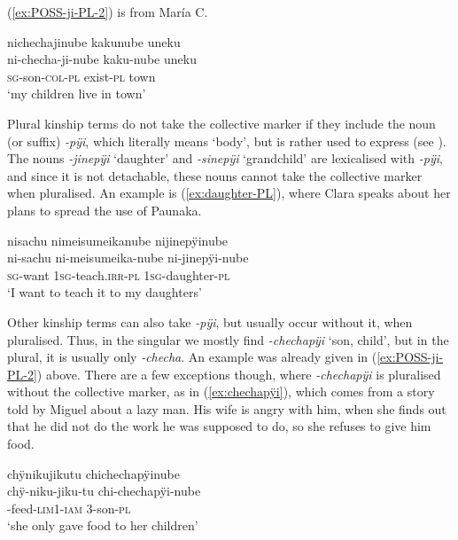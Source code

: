 (\ref{ex:POSS-ji-PL-2}) is from María C.

\ea\label{ex:POSS-ji-PL-2}
\begingl 
\glpreamble nichechajinube kakunube uneku\\
\gla ni-checha-ji-nube kaku-nube uneku\\ 
\textsc{sg}-son-\textsc{col}-\textsc{pl} exist-\textsc{pl} town\\ 
\glft ‘my children live in town’\\ 
\endgl
\trailingcitation{[uxx-p110825l.075]}
\xe
{}


Plural kinship terms do not take the collective marker if they include the noun (or suffix) \textit{-pÿi}, which literally means ‘body’, but is rather used to express  (see ). The nouns \textit{-jinepÿi} ‘daughter’ and \textit{-sinepÿi} ‘grandchild’ are lexicalised with \textit{-pÿi}, and since it is not detachable, these nouns cannot take the collective marker when pluralised. An example is (\ref{ex:daughter-PL}), where Clara speaks about her plans to spread the use of Paunaka.

\ea\label{ex:daughter-PL}
\begingl 
\glpreamble nisachu nimeisumeikanube nijinepÿinube\\
\gla ni-sachu ni-meisumeika-nube ni-jinepÿi-nube\\ 
\textsc{sg}-want 1\textsc{sg}-teach.\textsc{irr}-\textsc{pl} 1\textsc{sg}-daughter-\textsc{pl}\\ 
\glft ‘I want to teach it to my daughters’\\ 
\endgl
\trailingcitation{[cux-c120414ls-2.323]}
\xe

Other kinship terms can also take \textit{-pÿi}, but usually occur without it, when pluralised. Thus, in the singular we mostly find \textit{-chechapÿi} ‘son, child’, but in the plural, it is usually only \textit{-checha}. An example was already given in (\ref{ex:POSS-ji-PL-2}) above. There are a few exceptions though, where \textit{-chechapÿi} is pluralised without the collective marker, as in (\ref{ex:chechapÿi}), which comes from a story told by Miguel about a lazy man. His wife is angry with him, when she finds out that he did not do the work he was supposed to do, so she refuses to give him food.

\ea\label{ex:chechapÿi}
\begingl 
\glpreamble chÿnikujikutu chichechapÿinube\\
\gla chÿ-niku-jiku-tu chi-chechapÿi-nube\\ 
-feed-\textsc{lim}1-\textsc{iam} 3-son-\textsc{pl}\\ 
\glft ‘she only gave food to her children’\\ 
\endgl
\trailingcitation{[mox-n110920l.081]}
\xe

